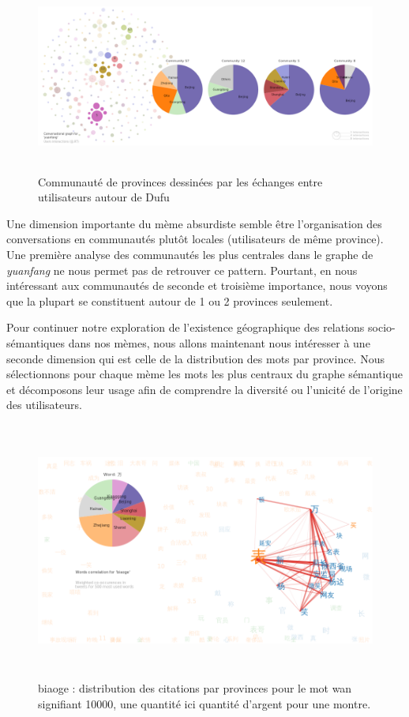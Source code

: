 \begin{figure}
    \centering
    \includegraphics[width=5.9996in,height=2.5004in]{figures/chap4/chapitre4-img58.png}
    \caption{
        Communauté de provinces dessinées par les échanges entre utilisateurs autour de Dufu
    }
    \label{fig:dufu-users-pie}
\end{figure}


Une dimension importante du mème absurdiste semble être l{\textquoteright}organisation des conversations en communautés plut\^ot locales (utilisateurs de même province). Une première analyse des communautés les plus centrales dans le graphe de \textit{yuanfang} ne nous permet pas de retrouver ce pattern. Pourtant, en nous intéressant aux communautés de seconde et troisième importance, nous voyons que la plupart se constituent autour de 1 ou 2 provinces seulement.  

Pour continuer notre exploration de l{\textquoteright}existence géographique des relations socio-sémantiques dans nos mèmes, nous allons maintenant nous intéresser \`a une seconde dimension qui est celle de la distribution des mots par province. Nous sélectionnons pour chaque mème les mots les plus centraux du graphe sémantique et décomposons leur usage afin de comprendre la diversité ou l{\textquoteright}unicité de l{\textquoteright}origine des utilisateurs. 

\begin{figure}[h!]
    \centering
    \includegraphics[width=6.0087in,height=3.3386in]{figures/chap4/chapitre4-img59.png}
    \caption{
      biaoge : distribution des citations par provinces pour le mot wan signifiant 10000, une quantité ici quantité d{\textquoteright}argent pour une montre.
    }
    \label{fig:biaoge-words-pie-wan}
\end{figure}
 
